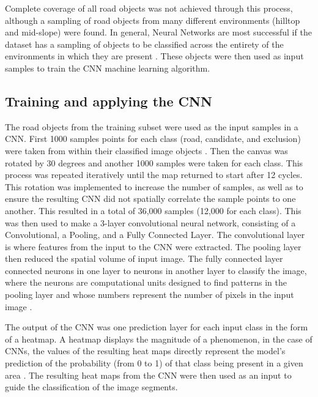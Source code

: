 \documentclass[remotesensing,article,submit,pdftex,moreauthors]{Definitions/mdpi}
\begin{document}
Complete coverage of all road objects was not achieved through this process, although a sampling of road objects from many different environments (hilltop and mid-slope) were found.  In general, Neural Networks are most successful if the dataset has a sampling of objects to be classified across the entirety of the environments in which they are present \cite{prakash}. These objects were then used as input samples to train the CNN machine learning algorithm.  

\subsection{Training and applying the CNN}
The road objects from the training subset were used as the input samples in a CNN. First 1000 samples points for each class (road, candidate, and exclusion) were taken from within their classified image objects  . Then the canvas was rotated by 30 degrees and another 1000 samples were taken for each class. This process was repeated iteratively until the map returned to start after 12 cycles. This rotation was implemented to increase the number of samples, as well as to ensure the resulting CNN did not spatially correlate the sample points to one another. This resulted in a total of 36,000 samples (12,000 for each class). This was then used to make a 3-layer convolutional neural network, consisting of a Convolutional, a Pooling, and a Fully Connected Layer. The convolutional layer is where features from the input to the CNN were extracted. The pooling layer then reduced the spatial volume of input image. The fully connected layer connected neurons in one layer to neurons in another layer to classify the image, where the neurons are computational units designed to find patterns in the pooling layer and whose numbers represent the number of pixels in the input image \cite{prakash}.

The output of the CNN was one prediction layer for each input class in the form of a heatmap. A heatmap displays the magnitude of a phenomenon, in the case of CNNs, the values of the resulting heat maps directly represent the model’s prediction of the probability (from 0 to 1) of that class being present in a given area \cite{prakash, timilsina}. The resulting heat maps from the CNN were then used as an input to guide the classification of the image segments.
\end{document}

